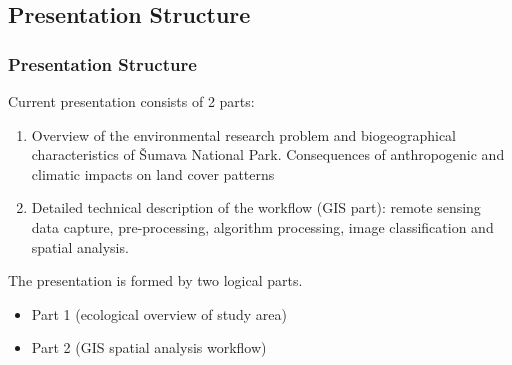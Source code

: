 \documentclass[pdflatex,compress,8pt,
	xcolor={dvipsnames,dvipsnames,svgnames,x11names,table},
	hyperref={
	breaklinks = true, 
	pdfauthor={Lemenkova Polina}, 
	pdfsubject={Preentation}, 
	pdfcreator={Lemenkova Polina}, 
	pdfproducer={Lemenkova Polina}, 
	colorlinks=true,linkcolor=blue, 
	citecolor=NavyBlue, 
	urlcolor = NavyBlue, 
	breaklinks = true}]{beamer}
\begin{document}
\subsection{Presentation Structure}
\begin{frame}\frametitle{Presentation Structure}
 Current presentation consists of 2 parts:
 \begin{enumerate}
	\item Overview of the environmental research problem and biogeographical characteristics of \v{S}umava National Park. Consequences of anthropogenic and climatic impacts on land cover patterns
	\item Detailed technical description of the workflow (GIS part): remote sensing data capture, pre-processing, algorithm processing, image classification and spatial analysis.
\end{enumerate}

The presentation is formed by two logical parts.
\begin{itemize}
	\item Part 1 (ecological overview of study area)
	\item Part 2 (GIS spatial analysis workflow)
\end{itemize}
\end{frame}
\end{document}
